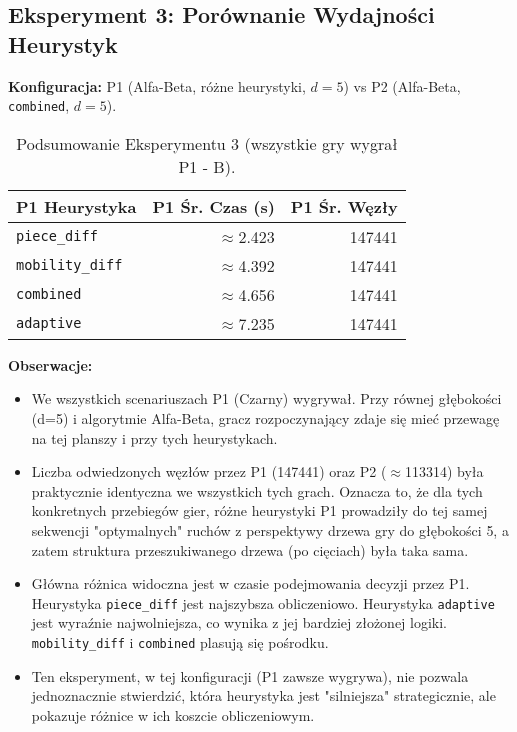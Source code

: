 \documentclass[11pt,a4paper]{article}
\newcommand{\code}[1]{\texttt{#1}} %
\begin{document}
\subsection{Eksperyment 3: Porównanie Wydajności Heurystyk}
\textbf{Konfiguracja:} P1 (Alfa-Beta, różne heurystyki, $d=5$) vs P2 (Alfa-Beta, \code{combined}, $d=5$).
\begin{table}[H]
    \centering
    \caption{Podsumowanie Eksperymentu 3 (wszystkie gry wygrał P1 - B).}
    \begin{tabular}{lrr}
        \toprule
        P1 Heurystyka & P1 Śr. Czas (s) & P1 Śr. Węzły \\ %
        \midrule
        \code{piece\_diff}   & $\approx$2.423 & 147441 \\
        \code{mobility\_diff}& $\approx$4.392 & 147441 \\
        \code{combined}      & $\approx$4.656 & 147441 \\
        \code{adaptive}      & $\approx$7.235 & 147441 \\
        \bottomrule
    \end{tabular}
    \label{tab:e3_summary}
\end{table}
\textbf{Obserwacje:}
\begin{itemize}
    \item We wszystkich scenariuszach P1 (Czarny) wygrywał. Przy równej głębokości (d=5) i algorytmie Alfa-Beta, gracz rozpoczynający zdaje się mieć przewagę na tej planszy i przy tych heurystykach.
    \item Liczba odwiedzonych węzłów przez P1 (147441) oraz P2 ($\approx$113314) była praktycznie identyczna we wszystkich tych grach. Oznacza to, że dla tych konkretnych przebiegów gier, różne heurystyki P1 prowadziły do tej samej sekwencji "optymalnych" ruchów z perspektywy drzewa gry do głębokości 5, a zatem struktura przeszukiwanego drzewa (po cięciach) była taka sama.
    \item Główna różnica widoczna jest w czasie podejmowania decyzji przez P1. Heurystyka \code{piece\_diff} jest najszybsza obliczeniowo. Heurystyka \code{adaptive} jest wyraźnie najwolniejsza, co wynika z jej bardziej złożonej logiki. \code{mobility\_diff} i \code{combined} plasują się pośrodku.
    \item Ten eksperyment, w tej konfiguracji (P1 zawsze wygrywa), nie pozwala jednoznacznie stwierdzić, która heurystyka jest "silniejsza" strategicznie, ale pokazuje różnice w ich koszcie obliczeniowym.
\end{itemize}
\end{document}
